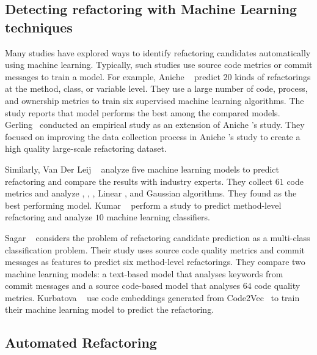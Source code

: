 \subsection{Detecting refactoring with Machine Learning techniques}

Many studies have explored ways to identify refactoring candidates automatically using machine learning.
Typically, such studies use
source code metrics or commit messages to train a model. For example, Aniche \etal{}~\cite{Aniche2020Effectiveness} predict $20$ kinds of refactorings at the method, class, or variable level. 
They use a large number of code, process, and ownership metrics to train six supervised machine learning algorithms. 
The study reports that \rf{} model performs the best among the compared models.
Gerling~\cite{Gerling2020Machine} conducted an empirical study as an extension of Aniche \etal{}'s study. 
They focused on improving the data collection process in Aniche \etal{}'s study to create a high quality large-scale refactoring dataset. 


Similarly, Van Der Leij \etal{}~\cite{VanDerLeij2021Data} analyze five machine learning models to predict \exm{} refactoring and compare the results with industry experts.
They collect $61$ code metrics and analyze \rf{}, \dt{}, \logr{}, Linear \SVM{}, and Gaussian \nb{} algorithms. 
They found \rf{} as the best performing model. 
Kumar \etal{}~\cite{Kumar2019Method} perform a study to predict method-level refactoring and analyze $10$ machine learning classifiers. 

Sagar \etal{}~\cite{Sagar2021Comparing} considers the problem of refactoring candidate prediction as a multi-class classification problem. 
Their study uses source code quality metrics and commit messages as features to predict six method-level refactorings. 
They compare two machine learning models: a text-based model that analyses keywords from commit messages and a source code-based model that analyses $64$ code quality metrics. 
Kurbatova \etal{}~\cite{Kurbatova2020Recommendation} use code embeddings generated from Code2Vec~\cite{Alon2019Code2vec} to train their machine learning model to predict the \mm{} refactoring. 




\subsection{Automated Refactoring}

